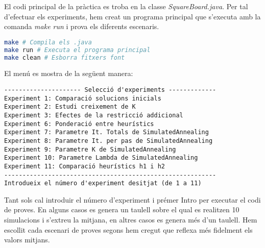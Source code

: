 
El codi principal de la pràctica es troba en la classe \emph{SquareBoard.java}. Per tal d'efectuar els experiments, hem creat un programa principal que s'executa amb la comanda \emph{make run} i prova els diferents escenaris.

\begin{lstlisting}[caption=Comandes, label=comandes, language=Bash]
make # Compila els .java
make run # Executa el programa principal
make clean # Esborra fitxers font
\end{lstlisting}

El menú es mostra de la següent manera:

\begin{verbatim}
--------------------- Selecció d'experiments -------------
Experiment 1: Comparació solucions inicials
Experiment 2: Estudi creixement de K
Experiment 3: Efectes de la restricció addicional
Experiment 6: Ponderació entre heurístics
Experiment 7: Parametre It. Totals de SimulatedAnnealing
Experiment 8: Parametre It. per pas de SimulatedAnnealing
Experiment 9: Parametre K de SimulatedAnnealing
Experiment 10: Parametre Lambda de SimulatedAnnealing
Experiment 11: Comparació heurístics h1 i h2
----------------------------------------------------------
Introdueix el número d'experiment desitjat (de 1 a 11)
\end{verbatim}

Tant sols cal introduir el número d'experiment i prémer Intro per executar el codi de proves. En alguns casos es genera un taulell sobre el qual es realitzen 10 simulacions i s'extreu la mitjana, en altres casos es genera més d'un taulell. Hem escollit cada escenari de proves segons hem cregut que reflexa més fidelment els valors mitjans.